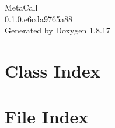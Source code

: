 \let\mypdfximage\pdfximage\def\pdfximage{\immediate\mypdfximage}\documentclass[twoside]{book}
\newcommand{\+}{\discretionary{\mbox{\scriptsize$\hookleftarrow$}}{}{}}
\newcommand{\clearemptydoublepage}{%
  \newpage{\pagestyle{empty}\cleardoublepage}%
}
\begin{document}
\begin{titlepage}
\vspace*{7cm}
\begin{center}%
{\Large Meta\+Call \\[1ex]\large 0.\+1.\+0.\+e6cda9765a88 }\\
\vspace*{1cm}
{\large Generated by Doxygen 1.8.17}\\
\end{center}
\end{titlepage}
\clearemptydoublepage
{}
\tableofcontents
\clearemptydoublepage
{}

\chapter{Class Index}

\chapter{File Index}

\end{document}
